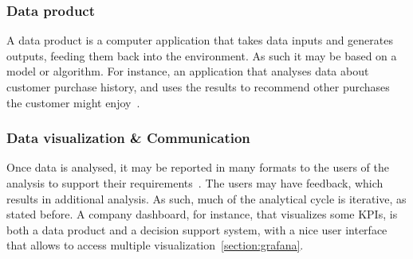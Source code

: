\subsubsection{Data product}
A data product is a computer application that takes data inputs and generates outputs, feeding them back into the environment.
As such it may be based on a model or algorithm. For instance, an application that analyses data about customer purchase history, and uses the results to recommend other purchases the customer might enjoy~\cite{Book:doing_data_science}.

\subsubsection{Data visualization \& Communication}
Once data is analysed, it may be reported in many formats to the users of the analysis to support their requirements~\cite{Article:intro_to_data_analysis}.
The users may have feedback, which results in additional analysis. As such, much of the analytical cycle is iterative, as stated before.
A company dashboard, for instance, that visualizes some \ac{KPIs}, is both a data product and a decision support system, with a nice user interface that allows  to access multiple visualization~\ref{section:grafana}.

